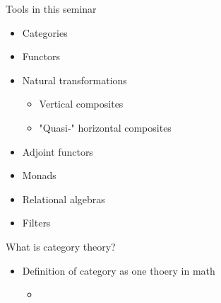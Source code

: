\documentclass[dvipdfmx,10pt,notheorems]{beamer}
\renewcommand{\#}{^\sharp}
\begin{document}
	\begin{frame}{Tools in this seminar}
		\begin{itemize}
			\item Categories
			\item Functors
			\item Natural transformations
				\begin{itemize}
					\item Vertical composites
					\item "Quasi-" horizontal composites
				\end{itemize}
			\item Adjoint functors
			\item Monads
			\item Relational algebras
			\item Filters
		\end{itemize}
	\end{frame}






	\begin{frame}{What is category theory?}
		\begin{itemize}
			\item Definition of category as one thoery in math
				\begin{itemize}
					\item
				\end{itemize}
		\end{itemize}
	\end{frame}
\end{document}
